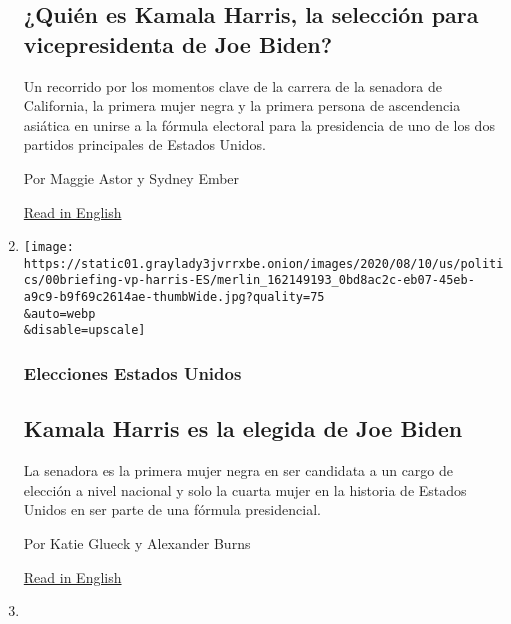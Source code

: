 \begin{enumerate}
  \hypertarget{quiuxe9n-es-kamala-harris-la-selecciuxf3n-para-vicepresidenta-de-joe-biden}{%
  \subsection{¿Quién es Kamala Harris, la selección para vicepresidenta
  de Joe
  Biden?}\label{quiuxe9n-es-kamala-harris-la-selecciuxf3n-para-vicepresidenta-de-joe-biden}}

  Un recorrido por los momentos clave de la carrera de la senadora de
  California, la primera mujer negra y la primera persona de ascendencia
  asiática en unirse a la fórmula electoral para la presidencia de uno
  de los dos partidos principales de Estados Unidos.

  Por Maggie Astor y Sydney Ember

  \href{https://www.nytimes3xbfgragh.onion/2020/08/11/us/politics/kamala-bio.html}{Read
  in English}
\item
  \href{/es/2020/08/11/espanol/estados-unidos/kamala-harris-joe-biden-vicepresidenta.html}{}

  \texttt{[image: https://static01.graylady3jvrrxbe.onion/images/2020/08/10/us/politics/00briefing-vp-harris-ES/merlin\_162149193\_0bd8ac2c-eb07-45eb-a9c9-b9f69c2614ae-thumbWide.jpg?quality=75\\\&auto=webp\\\&disable=upscale]}

  \hypertarget{elecciones-estados-unidos}{%
  \subsubsection{Elecciones Estados
  Unidos}\label{elecciones-estados-unidos}}

  \hypertarget{kamala-harris-es-la-elegida-de-joe-biden}{%
  \subsection{Kamala Harris es la elegida de Joe
  Biden}\label{kamala-harris-es-la-elegida-de-joe-biden}}

  La senadora es la primera mujer negra en ser candidata a un cargo de
  elección a nivel nacional y solo la cuarta mujer en la historia de
  Estados Unidos en ser parte de una fórmula presidencial.

  Por Katie Glueck y Alexander Burns

  \href{https://www.nytimes3xbfgragh.onion/live/2020/08/11/us/biden-vs-trump/kamala-harris-will-join-biden-in-delaware}{Read
  in English}
\item
  \href{/es/2020/08/11/espanol/estados-unidos/3-noviembre-elecciones.html}{}


\end{enumerate}
